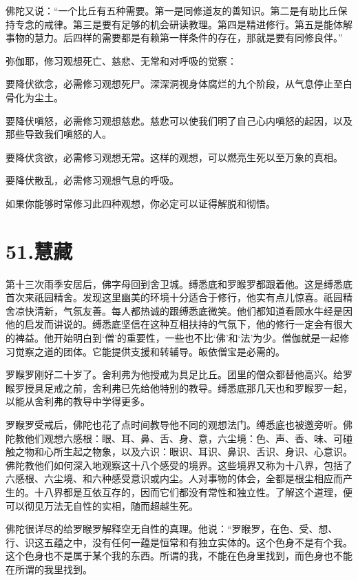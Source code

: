 \documentclass[12pt,twoside,openany]{book}
\begin{document}
佛陀又说：“一个比丘有五种需要。第一是同修道友的善知识。第二是有助比丘保持专念的戒律。第三是要有足够的机会研读教理。第四是精进修行。第五是能体解事物的慧力。后四样的需要都是有赖第一样条件的存在，那就是要有同修良伴。”

弥伽耶，修习观想死亡、慈悲、无常和对呼吸的觉察：

要降伏欲念，必需修习观想死尸。深深洞视身体腐烂的九个阶段，从气息停止至白骨化为尘土。

要降伏嗔怒，必需修习观想慈悲。慈悲可以使我们明了自己心内嗔怒的起因，以及那些导致我们嗔怒的人。

要降伏贪欲，必需修习观想无常。这样的观想，可以燃亮生死以至万象的真相。

要降伏散乱，必需修习观想气息的呼吸。

如果你能够时常修习此四种观想，你必定可以证得解脱和彻悟。


\chapter{51.慧藏}\label{ch51}

第十三次雨季安居后，佛字母回到舍卫城。缚悉底和罗睺罗都跟着他。这是缚悉底首次来祇园精舍。发现这里幽美的环境十分适合于修行，他实有点儿惊喜。祇园精舍凉快清新，气氛友善。每人都热诚的跟缚悉底微笑。他们都知道看顾水牛经是因他的启发而讲说的。缚悉底坚信在这种互相扶持的气氛下，他的修行一定会有很大的裨益。他开始明白到‘僧’的重要性，一些也不比‘佛’和‘法’为少。僧伽就是一起修习觉察之道的团体。它能提供支援和转辅导。皈依僧宝是必需的。

罗睺罗刚好二十岁了。舍利弗为他授戒为具足比丘。团里的僧众都替他高兴。给罗睺罗授具足戒之前，舍利弗已先给他特别的教导。缚悉底那几天也和罗睺罗一起，以能从舍利弗的教导中学得更多。

罗睺罗受戒后，佛陀也花了点时间教导他不同的观想法门。缚悉底也被邀旁听。佛陀教他们观想六感根：眼、耳、鼻、舌、身、意，六尘境：色、声、香、味、可碰触之物和心所生起之物象，以及六识：眼识、耳识、鼻识、舌识、身识、心意识。佛陀教他们如何深入地观察这十八个感受的境界。这些境界又称为十八界，包括了六感根、六尘境、和六种感受意识或内尘。人对事物的体会，全都是根尘相应而产生的。十八界都是互依互存的，因而它们都没有常性和独立性。了解这个道理，便可以彻见万法无自性的实相，随而超越生死。

佛陀很详尽的给罗睺罗解释空无自性的真理。他说：“罗睺罗，在色、受、想、行、识这五蕴之中，没有任何一蕴是恒常和有独立实体的。这个色身不是有个我。这个色身也不是属于某个我的东西。所谓的我，不能在色身里找到，而色身也不能在所谓的我里找到。
\end{document}

